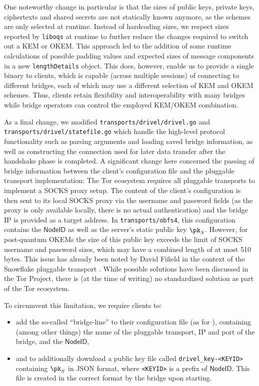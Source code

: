 One noteworthy change in particular is that the sizes of public keys, private keys, ciphertexts and shared secrets are not statically known anymore, as the schemes are only selected at runtime.
Instead of hardcoding sizes, we respect sizes reported by \texttt{liboqs} at runtime to further reduce the changes required to switch out a KEM or OKEM.
This approach led to the addition of some runtime calculations of possible padding values and expected sizes of message components in a new \texttt{lengthDetails} object.
This does, however, enable us to provide a single binary to clients, which is capable (across multiple sessions) of connecting to different bridges, each of which may use a different selection of KEM and OKEM schemes. Thus, clients retain flexibility and interoperability with many bridges while bridge operators can control the employed KEM/OKEM combination.

As a final change, we modified \texttt{transports/drivel/drivel.go} and \texttt{transports/drivel/statefile.go} which handle the high-level protocol functionality such as parsing arguments and loading saved bridge information, as well as constructing the connection used for later data transfer after the handshake phase is completed.
A significant change here concerned the passing of bridge information between the client's configuration file and the pluggable transport implementation: The Tor ecosystem requires all pluggable transports to implement a SOCKS proxy setup. The content of the client's configuration is then sent to its local SOCKS proxy via the username and password fields (as the proxy is only available locally, there is no actual authentication) and the bridge IP is provided as a target address. In \texttt{transports/obfs4}, this configuration contains the $\mathsf{NodeID}$ as well as the server's static public key $\pk_S$. However, for post-quantum OKEMs the size of this public key exceeds the limit of SOCKS username and password sizes, which may have a combined length of at most 510 bytes. This issue has already been noted by David Fifield in the context of the Snowflake pluggable transport \cite{torprojectSnowflakeBridge}. While possible solutions have been discussed in the Tor Project, there is (at the time of writing) no standardized solution as part of the Tor ecosystem.

To circumvent this limitation, we require clients to:
\begin{itemize}
    \item add the so-called ``bridge-line'' to their configuration file (as for \obfsfour{}), containing (among other things) the name of the pluggable transport, IP and port of the bridge, and the $\mathsf{NodeID}$,
    \item and to additionally download a public key file called \texttt{drivel\_key-<KEYID>} containing $\pk_S$ in JSON format, where \texttt{<KEYID>} is a prefix of $\mathsf{NodeID}$. This file is created in the correct format by the bridge upon starting.
\end{itemize}


